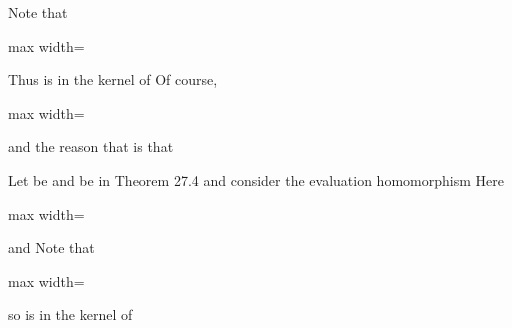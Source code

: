 \documentclass[11pt,oneside]{article}
\begin{document}
\begin{BookBody}
\noindent Note that

\begin{center}\begin{adjustbox}{max width=\linewidth}\end{adjustbox}\end{center}

\noindent Thus  is in the kernel  of  Of course,

\begin{center}\begin{adjustbox}{max width=\linewidth}\end{adjustbox}\end{center}

\noindent and the reason that  is that  \BookEnd{\blacktriangle}

 Let  be  and  be  in Theorem 27.4 and consider the evaluation homomorphism  Here

\begin{center}\begin{adjustbox}{max width=\linewidth}\end{adjustbox}\end{center}

\noindent and  Note that

\begin{center}\begin{adjustbox}{max width=\linewidth}\end{adjustbox}\end{center}

\noindent so  is in the kernel  of  \BookEnd{\blacktriangle}

\end{BookBody}

\BookNarrativetrue
\end{document}
